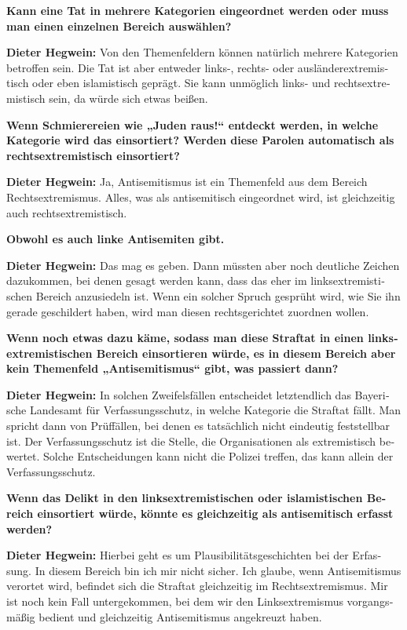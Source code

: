 \begin{otherlanguage}{ngerman}
\textbf{Kann eine Tat in mehrere Kategorien eingeordnet werden oder muss man einen einzelnen Bereich auswählen?} 

\textbf{Dieter Hegwein:} Von den Themenfeldern können natürlich mehrere Kategorien betroffen sein. Die Tat ist aber entweder links-, rechts- oder ausländerextremistisch oder eben islamistisch geprägt. Sie kann unmöglich links- und rechtsextremistisch sein, da würde sich etwas beißen.

\textbf{Wenn Schmierereien wie „Juden raus!“ entdeckt werden, in welche Kategorie wird das einsortiert? Werden diese Parolen automatisch als rechtsextremistisch einsortiert?}

\textbf{Dieter Hegwein:} Ja, Antisemitismus ist ein Themenfeld aus dem Bereich Rechtsextremismus. Alles, was als antisemitisch eingeordnet wird, ist gleichzeitig auch rechtsextremistisch.

\textbf{Obwohl es auch linke Antisemiten gibt.}

\textbf{Dieter Hegwein:} Das mag es geben. Dann müssten aber noch deutliche Zeichen dazukommen, bei denen gesagt werden kann, dass das eher im linksextremistischen Bereich anzusiedeln ist. Wenn ein solcher Spruch gesprüht wird, wie Sie ihn gerade geschildert haben, wird man diesen rechtsgerichtet zuordnen wollen.

\textbf{Wenn noch etwas dazu käme, sodass man diese Straftat in einen linksextremistischen Bereich einsortieren würde, es in diesem Bereich aber kein Themenfeld „Antisemitismus“ gibt, was passiert dann?} 

\textbf{Dieter Hegwein:} In solchen Zweifelsfällen entscheidet letztendlich das Bayerische Landesamt für Verfassungsschutz, in welche Kategorie die Straftat fällt. Man spricht dann von Prüffällen, bei denen es tatsächlich nicht eindeutig feststellbar ist. Der Verfassungsschutz ist die Stelle, die Organisationen als extremistisch bewertet. Solche Entscheidungen kann nicht die Polizei treffen, das kann allein der Verfassungsschutz.

\textbf{Wenn das Delikt in den linksextremistischen oder islamistischen Bereich einsortiert würde, könnte es gleichzeitig als antisemitisch erfasst werden?}

\textbf{Dieter Hegwein:} Hierbei geht es um Plausibilitätsgeschichten bei der Erfassung. In diesem Bereich bin ich mir nicht sicher. Ich glaube, wenn Antisemitismus verortet wird, befindet sich die Straftat gleichzeitig im Rechtsextremismus. Mir ist noch kein Fall untergekommen, bei dem wir den Linksextremismus vorgangsmäßig bedient und gleichzeitig Antisemitismus angekreuzt haben.


\end{otherlanguage}
